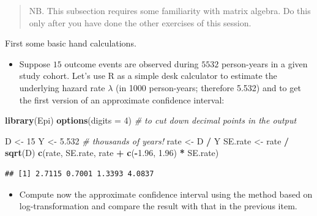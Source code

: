 \documentclass[
]{book}
\newenvironment{Shaded}{\begin{snugshade}}{\end{snugshade}}
\newcommand{\AttributeTok}[1]{\textcolor[rgb]{0.13,0.29,0.53}{#1}}
\newcommand{\CommentTok}[1]{\textcolor[rgb]{0.56,0.35,0.01}{\textit{#1}}}
\newcommand{\DecValTok}[1]{\textcolor[rgb]{0.00,0.00,0.81}{#1}}
\newcommand{\FloatTok}[1]{\textcolor[rgb]{0.00,0.00,0.81}{#1}}
\newcommand{\FunctionTok}[1]{\textcolor[rgb]{0.13,0.29,0.53}{\textbf{#1}}}
\newcommand{\NormalTok}[1]{#1}
\newcommand{\OtherTok}[1]{\textcolor[rgb]{0.56,0.35,0.01}{#1}}
\newcommand{\SpecialCharTok}[1]{\textcolor[rgb]{0.81,0.36,0.00}{\textbf{#1}}}
\providecommand{\tightlist}{%
  \setlength{\itemsep}{0pt}\setlength{\parskip}{0pt}}
\theoremstyle{definition}
\theoremstyle{definition}
\theoremstyle{definition}
\theoremstyle{definition}
\theoremstyle{remark}
\begin{document}
\begin{quote}
NB. This subsection requires some familiarity with matrix algebra. Do this only after you have done the other exercises of this session.
\end{quote}

First some basic hand calculations.

\begin{itemize}
\tightlist
\item
  Suppose \(15\) outcome events are observed during \(5532\) person-years in a given study cohort.
  Let's use R as a simple desk calculator to estimate the underlying hazard rate \(\lambda\) (in 1000
  person-years; therefore 5.532) and to get the first version of an approximate confidence
  interval:
\end{itemize}

\begin{Shaded}
\begin{Highlighting}[]
\FunctionTok{library}\NormalTok{(Epi)}
\FunctionTok{options}\NormalTok{(}\AttributeTok{digits =} \DecValTok{4}\NormalTok{) }\CommentTok{\#  to cut down decimal points in the output}
\end{Highlighting}
\end{Shaded}

\begin{Shaded}
\begin{Highlighting}[]
\NormalTok{D }\OtherTok{\textless{}{-}} \DecValTok{15}
\NormalTok{Y }\OtherTok{\textless{}{-}} \FloatTok{5.532} \CommentTok{\# thousands of years!}
\NormalTok{rate }\OtherTok{\textless{}{-}}\NormalTok{ D }\SpecialCharTok{/}\NormalTok{ Y}
\NormalTok{SE.rate }\OtherTok{\textless{}{-}}\NormalTok{ rate }\SpecialCharTok{/} \FunctionTok{sqrt}\NormalTok{(D)}
\FunctionTok{c}\NormalTok{(rate, SE.rate, rate }\SpecialCharTok{+} \FunctionTok{c}\NormalTok{(}\SpecialCharTok{{-}}\FloatTok{1.96}\NormalTok{, }\FloatTok{1.96}\NormalTok{) }\SpecialCharTok{*}\NormalTok{ SE.rate)}
\end{Highlighting}
\end{Shaded}

\begin{verbatim}
## [1] 2.7115 0.7001 1.3393 4.0837
\end{verbatim}

\begin{itemize}
\tightlist
\item
  Compute now the approximate confidence interval using the method
  based on log-transformation and compare the result with that in the previous item.
\end{itemize}
\end{document}
